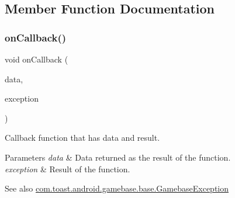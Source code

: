 \subsection{Member Function Documentation}
\mbox{\label{interfacecom_1_1toast_1_1android_1_1gamebase_1_1_gamebase_data_callback_a6898f6f2398c6b6f84a4de7fca381e61}} 
\subsubsection{\texorpdfstring{on\+Callback()}{onCallback()}}
{\footnotesize\ttfamily void on\+Callback (\begin{DoxyParamCaption}\item[{T}]{data,  }\item[{\hyperlink{classcom_1_1toast_1_1android_1_1gamebase_1_1base_1_1_gamebase_exception}{Gamebase\+Exception}}]{exception }\end{DoxyParamCaption})}



Callback function that has data and result. 


\begin{DoxyParams}{Parameters}
{\em data} & Data returned as the result of the function. \\
\hline
{\em exception} & Result of the function. \\
\hline
\end{DoxyParams}
\begin{DoxySeeAlso}{See also}
\hyperlink{classcom_1_1toast_1_1android_1_1gamebase_1_1base_1_1_gamebase_exception}{com.\+toast.\+android.\+gamebase.\+base.\+Gamebase\+Exception} 
\end{DoxySeeAlso}
